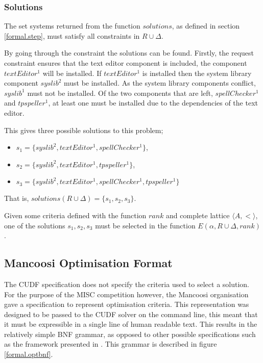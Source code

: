 \subsubsection{Solutions}
The set systems returned from the function $solutions$, as defined in section \ref{formal.step}, must satisfy all constraints in $R \cup \Delta$.

By going through the constraint the solutions can be found.
Firstly, the request constraint ensures that the text editor component is included, the component $textEditor^1$ will be installed.
If $textEditor^1$ is installed then the system library component $syslib^2$ must be installed.
As the system library components conflict, $syslib^1$ must not be installed.
Of the two components that are left, $spellChecker^1$ and $tpspeller^1$, at least one must be installed due to the dependencies of the text editor.

This gives three possible solutions to this problem;
\begin{itemize}
  \item $s_1 = \{syslib^2, textEditor^1, spellChecker^1\}$,
  \item $s_2 = \{syslib^2, textEditor^1, tpspeller^1\}$,
  \item $s_3 = \{syslib^2, textEditor^1, spellChecker^1, tpspeller^1\}$
\end{itemize}
That is, $solutions(R \cup \Delta) = \{s_1,s_2,s_3\}$.

Given some criteria defined with the function $rank$ and complete lattice $\langle A , < \rangle$, 
one of the solutions $s_1,s_2,s_3$ must be selected in the function $E(\alpha, R \cup \Delta,rank)$. 

\subsection{Mancoosi Optimisation Format}
\label{formal.mancoosioptimisationformat}
The CUDF specification does not specify the criteria used to select a solution.
For the purpose of the MISC competition however, the Mancoosi organisation gave a specification to represent optimisation criteria.
This representation was designed to be passed to the CUDF solver on the command line, this meant that it must be expressible in a single line of human readable text.
This results in the relatively simple BNF grammar, as opposed to other possible specifications such as the framework presented in \cite{treinen2009}. 
This grammar is described in figure \ref{formal.optbnf}.

